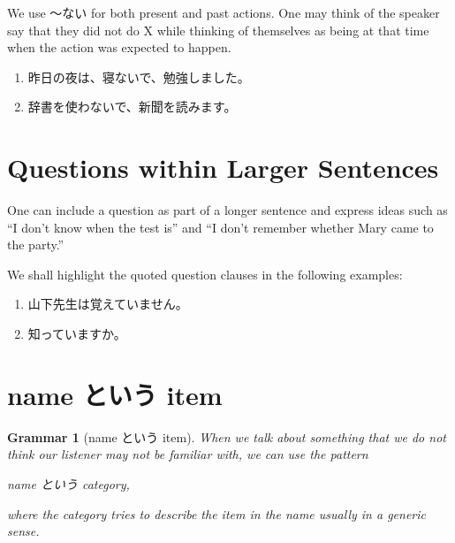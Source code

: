 \documentclass[notoc,notitlepage]{tufte-book}
\newtheorem{grammar}{\faBook Grammar}
\begin{document}
\begin{note}
  We use 〜ない for both present and past actions.
  One may think of the speaker say that they did not do X
  while thinking of themselves as being at that time when
  the action was expected to happen.
\end{note}

\begin{eg}
  \begin{enumerate}
    \item 昨日の夜は、寝ないで、勉強しました。
    \item 辞書を使わないで、新聞を読みます。
  \end{enumerate}
\end{eg}


\section{Questions within Larger Sentences}%
\label{sec:questions_within_larger_sentences}

One can include a question as part of a longer sentence
and express ideas such as ``I don't know when the test is''
and ``I don't remember whether Mary came to the party.''

\begin{eg}
  We shall highlight the quoted question clauses in the following
  examples:
  \begin{enumerate}
    \item 山下先生は覚えていません。
    \item {}知っていますか。 
  \end{enumerate}
\end{eg}


\section{name という item}%
\label{sec:name_toiu_item}

\begin{grammar}[name という item]\label{grammar:name_toiu_item}
  When we talk about something that we do not think our
  listener may not be familiar with, we can use the pattern
  \begin{center}
    name という category,
  \end{center}
  where the category tries to describe the item in the name
  usually in a generic sense.
\end{grammar}
\end{document}
